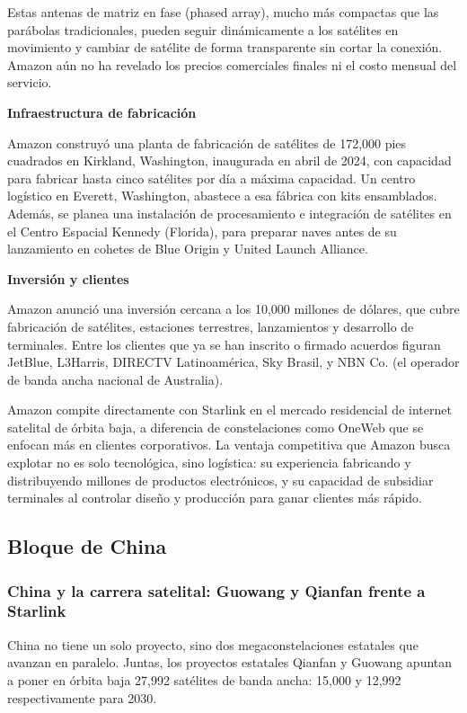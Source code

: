 Estas antenas de matriz en fase (phased array), mucho más compactas que las parábolas tradicionales, pueden seguir dinámicamente a los satélites en movimiento y cambiar de satélite de forma transparente sin cortar la conexión. Amazon aún no ha revelado los precios comerciales finales ni el costo mensual del servicio.

\noindent\textbf{Infraestructura de fabricación}

Amazon construyó una planta de fabricación de satélites de 172,000 pies cuadrados en Kirkland, Washington, inaugurada en abril de 2024, con capacidad para fabricar hasta cinco satélites por día a máxima capacidad. Un centro logístico en Everett, Washington, abastece a esa fábrica con kits ensamblados. Además, se planea una instalación de procesamiento e integración de satélites en el Centro Espacial Kennedy (Florida), para preparar naves antes de su lanzamiento en cohetes de Blue Origin y United Launch Alliance.

\noindent\textbf{Inversión y clientes}

Amazon anunció una inversión cercana a los 10,000 millones de dólares, que cubre fabricación de satélites, estaciones terrestres, lanzamientos y desarrollo de terminales. Entre los clientes que ya se han inscrito o firmado acuerdos figuran JetBlue, L3Harris, DIRECTV Latinoamérica, Sky Brasil, y NBN Co. (el operador de banda ancha nacional de Australia).

Amazon compite directamente con Starlink en el mercado residencial de internet satelital de órbita baja, a diferencia de constelaciones como OneWeb que se enfocan más en clientes corporativos. La ventaja competitiva que Amazon busca explotar no es solo tecnológica, sino logística: su experiencia fabricando y distribuyendo millones de productos electrónicos, y su capacidad de subsidiar terminales al controlar diseño y producción para ganar clientes más rápido.

\subsection{Bloque de China}
\subsubsection{China y la carrera satelital: Guowang y Qianfan frente a Starlink}

China no tiene un solo proyecto, sino dos megaconstelaciones estatales que avanzan en paralelo. Juntas, los proyectos estatales Qianfan y Guowang apuntan a poner en órbita baja 27,992 satélites de banda ancha: 15,000 y 12,992 respectivamente para 2030.

